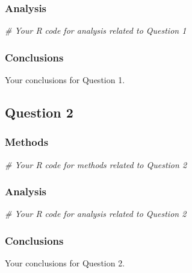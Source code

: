 \documentclass[
]{article}
\newenvironment{Shaded}{\begin{snugshade}}{\end{snugshade}}
\newcommand{\CommentTok}[1]{\textcolor[rgb]{0.56,0.35,0.01}{\textit{#1}}}
\begin{document}
\subsubsection{Analysis}\label{analysis-1}

\begin{Shaded}
\begin{Highlighting}[]
\CommentTok{\# Your R code for analysis related to Question 1}
\end{Highlighting}
\end{Shaded}

\subsubsection{Conclusions}\label{conclusions-1}

Your conclusions for Question 1.

\subsection{Question 2}\label{question-2}

\subsubsection{Methods}\label{methods-2}

\begin{Shaded}
\begin{Highlighting}[]
\CommentTok{\# Your R code for methods related to Question 2}
\end{Highlighting}
\end{Shaded}

\subsubsection{Analysis}\label{analysis-2}

\begin{Shaded}
\begin{Highlighting}[]
\CommentTok{\# Your R code for analysis related to Question 2}
\end{Highlighting}
\end{Shaded}

\subsubsection{Conclusions}\label{conclusions-2}

Your conclusions for Question 2.
\end{document}
